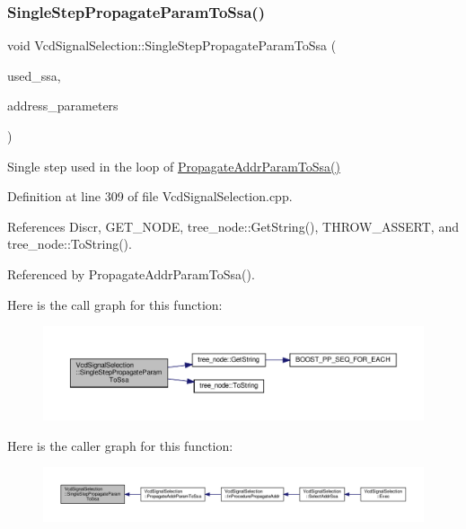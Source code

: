 \subsubsection{\texorpdfstring{Single\+Step\+Propagate\+Param\+To\+Ssa()}{SingleStepPropagateParamToSsa()}}
{\footnotesize\ttfamily void Vcd\+Signal\+Selection\+::\+Single\+Step\+Propagate\+Param\+To\+Ssa (\begin{DoxyParamCaption}\item[{const \hyperlink{classTreeNodeMap}{Tree\+Node\+Map}$<$ \hyperlink{tutorial__fpt__2017_2intro_2sixth_2test_8c_a7c94ea6f8948649f8d181ae55911eeaf}{size\+\_\+t} $>$ \&}]{used\+\_\+ssa,  }\item[{const \hyperlink{classTreeNodeSet}{Tree\+Node\+Set} \&}]{address\+\_\+parameters }\end{DoxyParamCaption})\hspace{0.3cm}{\ttfamily [protected]}}



Single step used in the loop of \hyperlink{classVcdSignalSelection_af1921e71908a17971a4da3ed06f3850b}{Propagate\+Addr\+Param\+To\+Ssa()} 



Definition at line 309 of file Vcd\+Signal\+Selection.\+cpp.



References Discr, G\+E\+T\+\_\+\+N\+O\+DE, tree\+\_\+node\+::\+Get\+String(), T\+H\+R\+O\+W\+\_\+\+A\+S\+S\+E\+RT, and tree\+\_\+node\+::\+To\+String().



Referenced by Propagate\+Addr\+Param\+To\+Ssa().

Here is the call graph for this function\+:
\nopagebreak
\begin{figure}[H]
\begin{center}
\leavevmode
\includegraphics[width=350pt]{dd/de4/classVcdSignalSelection_aab4caffd80c85ef0629242c2602b0780_cgraph}
\end{center}
\end{figure}
Here is the caller graph for this function\+:
\nopagebreak
\begin{figure}[H]
\begin{center}
\leavevmode
\includegraphics[width=350pt]{dd/de4/classVcdSignalSelection_aab4caffd80c85ef0629242c2602b0780_icgraph}
\end{center}
\end{figure}


